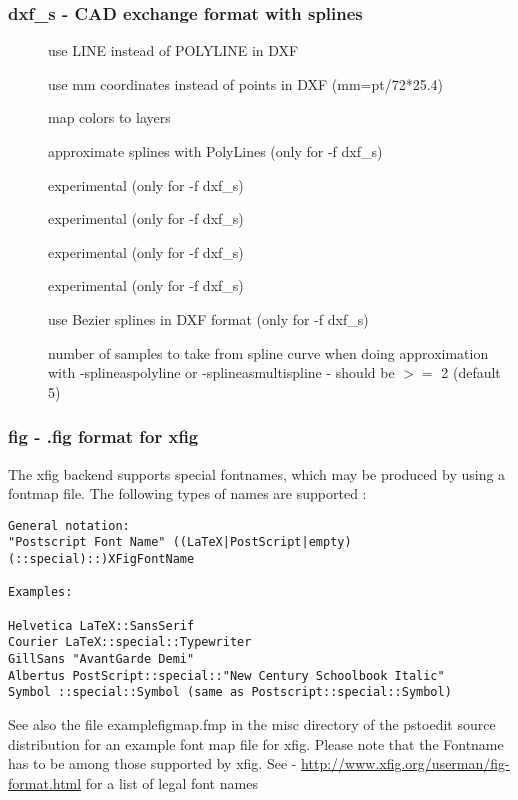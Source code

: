 \documentclass[english,a4paper]{article}
\let\URL\url \let\Email\url \let\File\url
\begin{document}
\subsubsection{dxf\_s - CAD exchange format with splines}
\begin{description}
\item[] 
use LINE instead of POLYLINE in DXF


\item[] 
use mm coordinates instead of points in DXF (mm=pt/72*25.4)


\item[] 
map colors to layers


\item[] 
approximate splines with PolyLines (only for -f dxf\_s)


\item[] 
experimental (only for -f dxf\_s)


\item[] 
experimental (only for -f dxf\_s)


\item[] 
experimental (only for -f dxf\_s)


\item[] 
experimental (only for -f dxf\_s)


\item[] 
use Bezier splines in DXF format (only for -f dxf\_s)


\item[] 
number of samples to take from spline curve when doing approximation with -splineaspolyline or -splineasmultispline - should be $>=$ 2 (default 5)


\end{description}
\subsubsection{fig - .fig format for xfig}
The xfig backend supports special fontnames, which may be produced by using a fontmap file. The following types of names are supported : \\  
\begin{verbatim}
General notation: 
"Postscript Font Name" ((LaTeX|PostScript|empty)(::special)::)XFigFontName
 
Examples:

Helvetica LaTeX::SansSerif
Courier LaTeX::special::Typewriter
GillSans "AvantGarde Demi"
Albertus PostScript::special::"New Century Schoolbook Italic" 
Symbol ::special::Symbol (same as Postscript::special::Symbol)
\end{verbatim}
See also the file examplefigmap.fmp in the misc directory of the pstoedit source distribution for an example font map file for xfig. Please note that the Fontname has to be among those supported by xfig. See - \URL{http://www.xfig.org/userman/fig-format.html} for a list of legal font names
\end{document}
